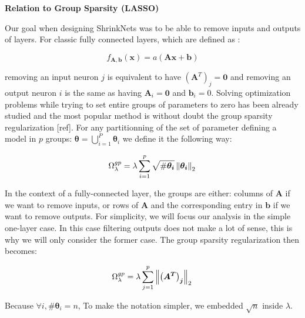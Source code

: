 \noindent\textbf{Relation to Group Sparsity (LASSO)}


Our goal when designing ShrinkNets was to be able to remove inputs
and outputs of layers. For classic fully connected layers, which are defined
as :

\begin{equation} \label{fully_connected}
  f_{\bm{A}, \bm{b}}(\bm{x})=a(\bm{Ax + b})
\end{equation}

removing an input neuron $j$ is equivalent to have $\left(\bm{A}^T\right)_j = \bm{0}$
and removing an output neuron $i$ is the same as having $\bm{A}_i = \bm{0}$ and $\bm{b}_i = 0$. Solving  optimization problems while trying to set entire groups
of parameters to zero has been already studied and the most popular method
is without doubt the group sparsity regularization [ref]. For any partitionning of the set of parameter defining a model in $p$ groups: $\bm{\theta} = \bigcup_{i=1}^P \bm{\theta}_i$ we define it the following way:

\begin{equation}
  \Omega_\lambda^{gp} = \lambda \sum_{i=1}^p \sqrt{\#\bm{\theta_i}} \left\lVert\bm{\theta_i}\right\rVert_2 \\
\end{equation}

In the context of a fully-connected layer, the groups are either: columns of $\bm{A}$ if we want to remove inputs, or rows of $\bm{A}$ and the corresponding entry in $\bm{b}$ if we want to remove outputs. For simplicity, we will focus our analysis in the simple one-layer case. In this case filtering outputs does not make a lot of sense, this is why we will only consider the former case. The group sparsity regularization then becomes:


\begin{equation} \label{group_sparsity_regularization}
  \Omega_\lambda^{gp} = \lambda \sum_{j=1}^p \left\lVert\bm{\left(A^T\right)_j}\right\rVert_2 \\
\end{equation}

Because $\forall i, \#\bm{\theta}_i = n$, To make the notation simpler,
we embedded $\sqrt{n}$ inside $\lambda$.


